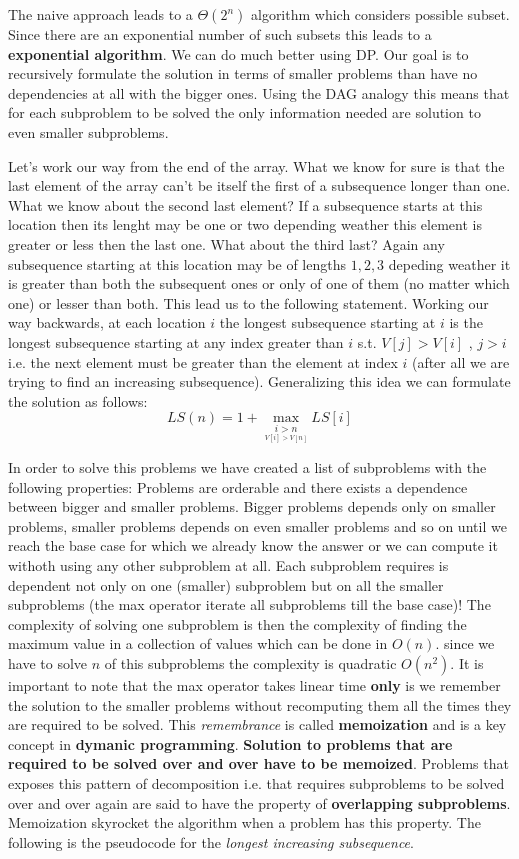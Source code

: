 The naive approach leads to a $\Theta(2^n)$ algorithm which considers possible subset. Since there are an exponential number of such subsets this leads to a \textbf{exponential algorithm}.
We can do much better using DP.
Our goal is to recursively formulate the solution in terms of smaller problems than have no dependencies at all with the bigger ones.  Using the DAG analogy this means that for each subproblem to be solved the only information needed are solution to even smaller subproblems.

Let's work our way from the end of the array. What we know for sure is that the last element of the array can't be itself the first of a subsequence longer than one.
What we know about the second last element?
If a subsequence starts at this location then its lenght may be one or two depending weather this element is greater or less then the last one.
What about the third last? Again any subsequence starting at this location may be of lengths $1,2,3$ depeding weather it is greater than both the subsequent ones or only of one of them (no matter which one) or lesser than both.
This lead us to the following statement. Working our way backwards, at each location $i$ the longest subsequence starting at $i$ is the longest subsequence starting at any index greater than $i$ s.t. $V[j] > V[i]$ , $j>i$ i.e. the next element must be greater than the element at index $i$ (after all we are trying to find an increasing subsequence). 
Generalizing this idea we can formulate the solution as follows:
\[
LS(n) = 1+ \underset{ \underset{ V[i] > V[n]}{i > n} }{\max}{ LS[i]}
\]
 
In order to solve this problems we have created a list of subproblems with the following properties:
Problems are orderable and there exists a dependence between bigger and smaller problems. Bigger problems depends only on smaller problems, smaller problems depends on even smaller problems and so on until we reach the base case for which we already know the answer or we can compute it withoth using any other subproblem at all.
Each subproblem requires is dependent not only on one (smaller) subproblem but on all the smaller subproblems (the max operator iterate all subproblems till the base case)!
The complexity of solving one subproblem is then the complexity of finding the maximum value in a collection of values which can be done in $O(n)$. since we have to solve $n$ of this subproblems the complexity is quadratic $O(n^2)$. It is important to note that the max operator takes linear time \textbf{only} is we remember the solution to the smaller problems without recomputing them all the times they are required to be solved. This \textit{remembrance} is called \textbf{memoization} and is a key concept in \textbf{dymanic programming}. \textbf{Solution to problems that are required to be solved over and over have to be memoized}. 
Problems that exposes this pattern of decomposition i.e. that requires subproblems to be solved over and over again are said to have the property of \textbf{overlapping subproblems}. Memoization skyrocket the algorithm when a problem has this property.
The following is the pseudocode for the \textit{longest increasing subsequence}.

